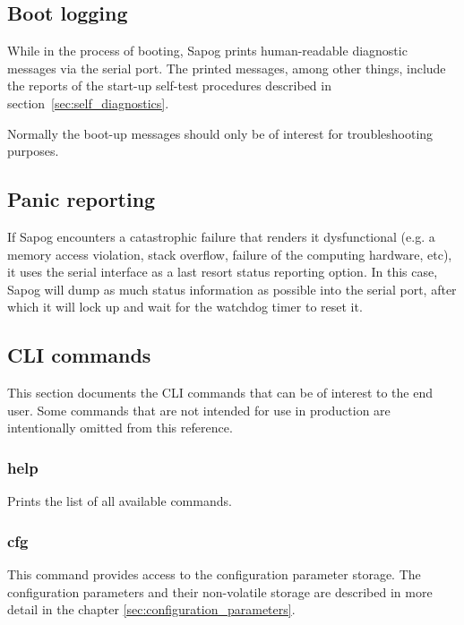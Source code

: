 \documentclass{zubaxdoc}
\begin{document}
\subsection{Boot logging}

While in the process of booting, Sapog prints human-readable diagnostic messages via the serial port.
The printed messages, among other things, include the reports of the start-up self-test procedures
described in section~\ref{sec:self_diagnostics}.

Normally the boot-up messages should only be of interest for troubleshooting purposes.

\subsection{Panic reporting}

If Sapog encounters a catastrophic failure that renders it dysfunctional
(e.g. a memory access violation, stack overflow, failure of the computing hardware, etc),
it uses the serial interface as a last resort status reporting option.
In this case, Sapog will dump as much status information as possible into the serial port,
after which it will lock up and wait for the watchdog timer to reset it.

\subsection{CLI commands}

This section documents the CLI commands that can be of interest to the end user.
Some commands that are not intended for use in production are intentionally omitted from this reference.

\subsubsection{help}

Prints the list of all available commands.

\subsubsection{cfg}

This command provides access to the configuration parameter storage.
The configuration parameters and their non-volatile storage are described in more detail in the chapter
\ref{sec:configuration_parameters}.
\end{document}

